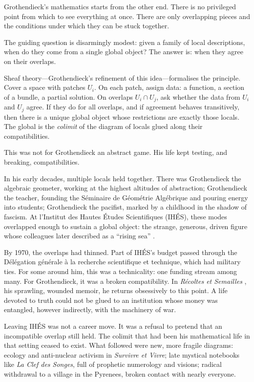 \documentclass[12pt,a4paper]{article}
\begin{document}
Grothendieck's mathematics starts from the other end. There is no privileged point from which to see everything at once. There are only overlapping pieces and the conditions under which they can be stuck together.

The guiding question is disarmingly modest: given a family of local descriptions, when do they come from a single global object? The answer is: when they agree on their overlaps.

Sheaf theory---Grothendieck's refinement of this idea---formalises the principle. Cover a space with patches $U_i$. On each patch, assign data: a function, a section of a bundle, a partial solution. On overlaps $U_i \cap U_j$, ask whether the data from $U_i$ and $U_j$ agree. If they do for all overlaps, and if agreement behaves transitively, then there is a unique global object whose restrictions are exactly those locals. The global is the \emph{colimit} of the diagram of locals glued along their compatibilities.

This was not for Grothendieck an abstract game. His life kept testing, and breaking, compatibilities.

In his early decades, multiple locals held together. There was Grothendieck the algebraic geometer, working at the highest altitudes of abstraction; Grothendieck the teacher, founding the S\'eminaire de G\'eom\'etrie Alg\'ebrique and pouring energy into students; Grothendieck the pacifist, marked by a childhood in the shadow of fascism. At l'Institut des Hautes \'Etudes Scientifiques (IH\'ES), these modes overlapped enough to sustain a global object: the strange, generous, driven figure whose colleagues later described as a ``rising sea'' \cite{mclarty}.

By 1970, the overlaps had thinned. Part of IH\'ES's budget passed through the D\'el\'egation g\'en\'erale \`a la recherche scientifique et technique, which had military ties. For some around him, this was a technicality: one funding stream among many. For Grothendieck, it was a broken compatibility. In \emph{R\'ecoltes et Semailles} \cite{grothendieck_res}, his sprawling, wounded memoir, he returns obsessively to this point. A life devoted to truth could not be glued to an institution whose money was entangled, however indirectly, with the machinery of war.

Leaving IH\'ES was not a career move. It was a refusal to pretend that an incompatible overlap still held. The colimit that had been his mathematical life in that setting ceased to exist. What followed were new, more fragile diagrams: ecology and anti-nuclear activism in \emph{Survivre et Vivre}; late mystical notebooks like \emph{La Clef des Songes}, full of prophetic numerology and visions; radical withdrawal to a village in the Pyrenees, broken contact with nearly everyone.
\end{document}
